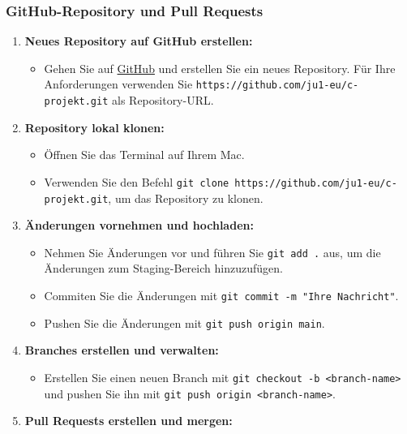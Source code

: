 \documentclass{vorlage-design-main}
\begin{document}
\hypertarget{github-repository-und-pull-requests}{%
\subsubsection{GitHub-Repository und Pull
Requests}\label{github-repository-und-pull-requests}}

\begin{enumerate}
\def\labelenumi{\arabic{enumi}.}

\item
  \textbf{Neues Repository auf GitHub erstellen:}

  \begin{itemize}
  
  \item
    Gehen Sie auf \href{https://github.com}{GitHub} und erstellen Sie
    ein neues Repository. Für Ihre Anforderungen verwenden Sie
    \verb|https://github.com/ju1-eu/c-projekt.git|
    als Repository-URL.
  \end{itemize}
\item
  \textbf{Repository lokal klonen:}

  \begin{itemize}
  
  \item
    Öffnen Sie das Terminal auf Ihrem Mac.
  \item
    Verwenden Sie den Befehl
    \verb|git clone https://github.com/ju1-eu/c-projekt.git|,
    um das Repository zu klonen.
  \end{itemize}
\item
  \textbf{Änderungen vornehmen und hochladen:}

  \begin{itemize}
  
  \item
    Nehmen Sie Änderungen vor und führen Sie
    \verb|git add .| aus, um die Änderungen zum
    Staging-Bereich hinzuzufügen.
  \item
    Commiten Sie die Änderungen mit
    \verb|git commit -m "Ihre Nachricht"|.
  \item
    Pushen Sie die Änderungen mit
    \verb|git push origin main|.
  \end{itemize}
\item
  \textbf{Branches erstellen und verwalten:}

  \begin{itemize}
  
  \item
    Erstellen Sie einen neuen Branch mit
    \verb|git checkout -b <branch-name>| und pushen
    Sie ihn mit \verb|git push origin <branch-name>|.
  \end{itemize}
\item
  \textbf{Pull Requests erstellen und mergen:}


\end{enumerate}
\end{document}
